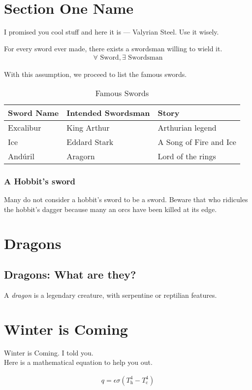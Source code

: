 \section{Section One Name}
\label{sec:chaptertwoname:sectiononename}
I promised you cool stuff and here it is --- Valyrian Steel. Use it wisely.

\begin{assump}
\label{assump:fundamental}
\normalfont
For every sword ever made, there exists a swordsman willing to wield it.
\begin{align}
\forall \text{ Sword}, \exists \text{ Swordsman}
\end{align}
\end{assump}
With this assumption, we proceed to list the famous swords.

\begin{table}
\caption{Famous Swords}
\label{tab:famousswords}
\centering
\begin{tabular}{lll}
\toprule
Sword Name & Intended Swordsman & Story\\
\midrule
Excalibur & King Arthur & Arthurian legend \\
Ice & Eddard Stark & A Song of Fire and Ice \\
And\'{u}ril & Aragorn & Lord of the rings \\
\bottomrule
\end{tabular}
\end{table}


\subsubsection{A Hobbit's sword}
\label{sec:chaptertwoname:hobbitsword}
Many do not consider a hobbit's sword to be a sword. Beware that who ridicules the 
hobbit's dagger because many an orcs have been killed at its edge.


\section{Dragons}
\label{sec:chaptertwoname:dragons}
\subsection{Dragons: What are they?}

\begin{defn}[Dragon]
\normalfont
A \emph{dragon} is a legendary creature, with serpentine or reptilian features.
\end{defn}


\section{Winter is Coming}
\label{sec:chaptertwoname:sectionthreename}

Winter is Coming. I told you. \\

Here is a mathematical equation to help you out.

\begin{align}
q = \epsilon \sigma \left( T_{\text{h}}^4 - T_{\text{c}}^4 \right)
\end{align}

